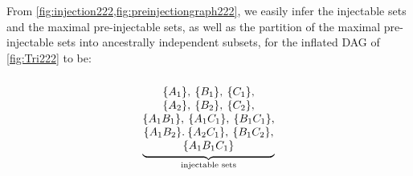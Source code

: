 {From \cref{fig:injection222,fig:preinjectiongraph222}, we easily infer the injectable sets and the maximal pre-injectable sets, as well as the partition of the maximal pre-injectable sets into ancestrally independent subsets, for the inflated DAG of \cref{fig:Tri222} to be:
\begin{align}\label{eq:basicsetup222}
{\underbrace{\begin{matrix}
\, \\
\brackets{A_1},\:\brackets{B_1},\:\brackets{C_1},\\
\brackets{A_2},\:\brackets{B_2},\:\brackets{C_2},\\
\brackets{A_1 B_1},\:\brackets{A_1 C_1},\:\brackets{B_1 C_1},\\
\brackets{A_1 B_2}.\:\brackets{A_2 C_1},\:\brackets{B_1 C_2},\\
\brackets{A_1 B_1 C_1}
\end{matrix}}_{\substack{\text{injectable sets}}}}

\end{align}}
